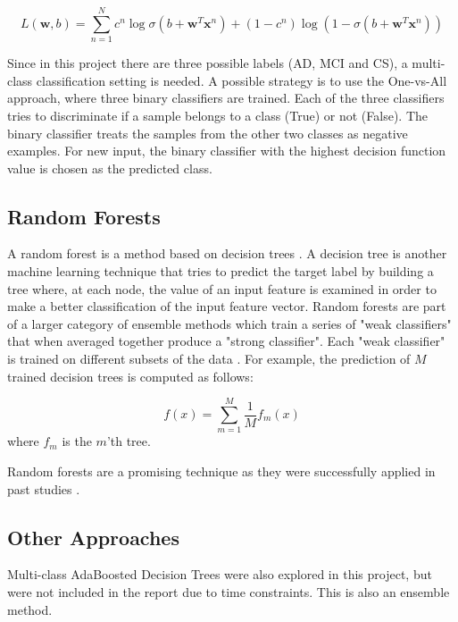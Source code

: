 		\begin{equation}\label{eq:loglike-logreg}
			L(\boldsymbol{w},b) = \sum\limits_{n=1}^{N} c^{n} \log \sigma(b + \boldsymbol{w}^{T}\boldsymbol{x}^n) + (1-c^{n}) \log\left(1-\sigma(b+\boldsymbol{w}^T\boldsymbol{x}^n) \right)
		\end{equation}
		
		Since in this project there are three possible labels (\ac{AD}, \ac{MCI} and \ac{CS}), a multi-class classification setting is needed. A possible strategy is to use the One-vs-All approach, where three binary classifiers are trained. Each of the three classifiers tries to discriminate if a sample belongs to a class (True) or not (False). The binary classifier treats the samples from the other two classes as negative examples. For new input, the binary classifier with the highest decision function value is chosen as the predicted class.  


		\subsection{Random Forests}
		A random forest is a method based on decision trees \autocite{breiman2001random}. A decision tree is another machine learning technique that tries to predict the target label by building a tree where, at each node, the value of an input feature is examined in order to make a better classification of the input feature vector. 
		Random forests are part of a larger category of ensemble methods which train a series of "weak classifiers" that when averaged together produce a "strong classifier". Each "weak classifier" is trained on different subsets of the data \autocite[550]{Murphy:2012:MLP:2380985}. For example, the prediction of \(M\) trained decision trees is computed as follows:

		\begin{equation}\label{eq:randfor}
			f(x) = \sum\limits_{m=1}^M \frac{1}{M}f_{m}(x)
		\end{equation}   
		where \(f_m\) is the \(m\)'th tree. 

		Random forests are a promising technique as they were successfully applied in past studies \autocite{Gray2013,Lehmann2007}.

		\subsection{Other Approaches}
		Multi-class AdaBoosted Decision Trees \autocite{Zhu2009ada} were also explored in this project, but were not included in the report due to time constraints. This is also an ensemble method.

